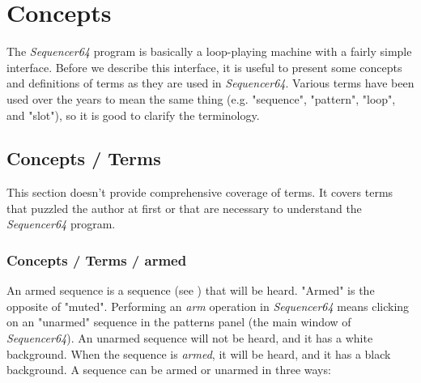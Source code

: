 %
%
%

\section{Concepts}
\label{sec:concepts}

   The \textsl{Sequencer64} program is basically a loop-playing machine with a 
   fairly simple interface.  Before we describe this interface, it is useful
   to present some concepts and definitions of terms as
   they are used in \textsl{Sequencer64}.  Various terms have been used over
   the years to mean the same thing (e.g. "sequence", "pattern", "loop", and
   "slot"), so it is good to clarify the terminology.

\subsection{Concepts / Terms}
\label{subsec:concepts_terms}

   This section doesn't provide comprehensive coverage of terms.  It
   covers terms that puzzled the author at first or that are
   necessary to understand the \textsl{Sequencer64} program.

\subsubsection{Concepts / Terms / armed}
\label{subsubsec:concepts_terms_armed}

   An armed sequence is a sequence
   (see )
   that will be heard.  "Armed" is the opposite
   of "muted".  Performing an \textsl{arm} operation in \textsl{Sequencer64}
   means clicking on an "unarmed" sequence in the patterns panel (the main
   window of \textsl{Sequencer64}).  An unarmed sequence will not be heard, and
   it has a white background.  When the sequence is \textsl{armed}, it will be
   heard, and it has a black background.
   A sequence can be armed or unarmed in three ways:

